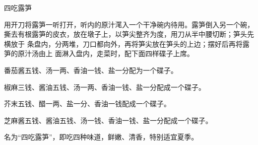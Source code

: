 %
%
%
%
%
%
%
\begin{recipe}{四吃露笋}

\ingredients


\preparation

\step 用开刀将露笋一听打开，听内的原汁滗入一个干净碗内待用。露笋倒入另一个碗，
撕去有根露笋的皮衣，放在墩子上，以笋尖整齐为度，用刀从半中腰切断；笋头先横放于
条盘内，分两堆，刀口都向外，再将笋尖放在笋头的上边；摆好后再将露笋的原汁汤由上
面淋入盘内，走菜时，配下面四样碟子上席。

\step 番茄酱五钱、汤一两、香油一钱、盐一分配为一个碟子。

\step 椒麻三钱、酱油五钱、汤一两、香油一钱、盐一分配成一个碟子。

\step 芥末五钱、醋一两、盐一分、香油一钱配成一个碟子。

\step 芝麻酱五钱、酱油五钱、汤一钱、香油一钱、盐一分配成一个碟子。

\features

名为“四吃露笋”，即吃四种味道，鲜嫩、清香，特别适宜夏季。

\end{recipe}

